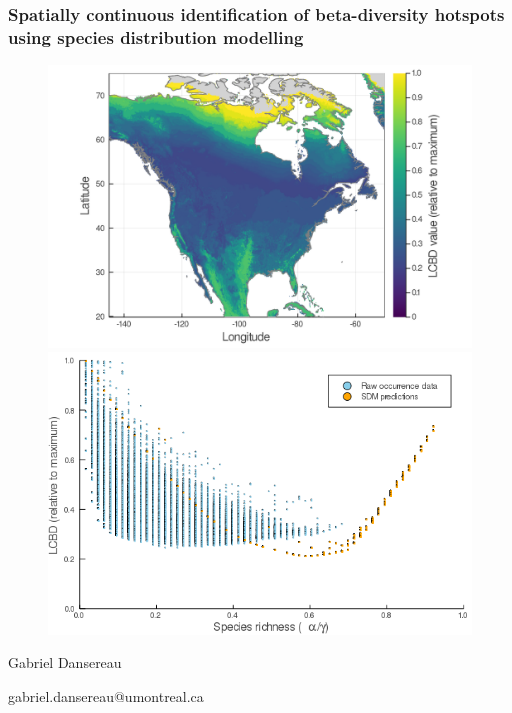 \documentclass[10pt, aspectratio=1610]{beamer}
\begin{document}
\begin{frame}
  \centering \frametitle{Spatially continuous identification of beta-diversity hotspots using species distribution modelling}
  \begin{figure}
    \centering
    \hspace*{-2cm}\includegraphics[scale=0.13]{fig/05_sdm_lcbd.png}
    \hspace*{-0cm}\includegraphics[scale=0.34]{fig/06_cmb_relation-oneplot.png}
  \end{figure}
  \medskip
  \centering
  Gabriel Dansereau

  gabriel.dansereau@umontreal.ca
\end{frame}
\end{document}
